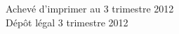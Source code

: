 \cleardoublepage
\mbox{}
\vfill

{\scriptsize
\begin{center}
Achevé d'imprimer au 3 trimestre 2012 \\
Dépôt légal\frcolon{} 3 trimestre 2012
\end{center}
}
\enlargethispage{\footskip}


